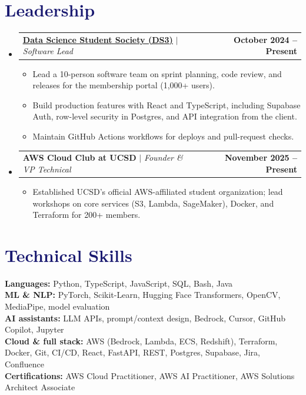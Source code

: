 \documentclass[letterpaper,11pt]{article}
\makeatletter
\newcommand{\resumeItem}[1]{
  \item\small{
    {#1 \vspace{-2pt}}
  }
}
\newcommand{\resumeProjectHeading}[2]{
    \item
    \begin{tabular*}{1.001\textwidth}{l@{\extracolsep{\fill}}r}
      \small#1 & \textbf{\small #2}\\
    \end{tabular*}\vspace{-7pt}
}
\newcommand{\resumeSubHeadingListStart}{\begin{itemize}[leftmargin=0.0in, label={}]}
\newcommand{\resumeSubHeadingListEnd}{\end{itemize}}
\newcommand{\resumeItemListStart}{\begin{itemize}}
\newcommand{\resumeItemListEnd}{\end{itemize}\vspace{-5pt}}
\newcommand\accentColor{MidnightBlue}
\makeatother
\begin{document}
\section{\textcolor{\accentColor}{Leadership}}
\vspace{-7pt}
\resumeSubHeadingListStart
\resumeProjectHeading{\textbf{\href{https://www.ds3atucsd.com/}{\underline{Data Science Student Society (DS3)}}} $|$ \emph{Software Lead}}{October 2024 -- Present}
\resumeItemListStart
\resumeItem{Lead a 10-person software team on sprint planning, code review, and releases for the membership portal (1,000+ users).}
\resumeItem{Build production features with React and TypeScript, including Supabase Auth, row-level security in Postgres, and API integration from the client.}
\resumeItem{Maintain GitHub Actions workflows for deploys and pull-request checks.}
\resumeItemListEnd
\vspace{-15pt}
\resumeProjectHeading{\textbf{AWS Cloud Club at UCSD} $|$ \emph{Founder \& VP Technical}}{November 2025 -- Present}
\resumeItemListStart
\resumeItem{Established UCSD's official AWS-affiliated student organization; lead workshops on core services (S3, Lambda, SageMaker), Docker, and Terraform for 200+ members.}
\resumeItemListEnd
\resumeSubHeadingListEnd
\vspace{-15pt}

\section{\textcolor{\accentColor}{Technical Skills}}
\begin{itemize}[leftmargin=0.15in, label={}]
  \small{\item{
        \textbf{Languages: }{Python, TypeScript, JavaScript, SQL, Bash, Java} \\
        \textbf{ML \& NLP: }{PyTorch, Scikit-Learn, Hugging Face Transformers, OpenCV, MediaPipe, model evaluation} \\
        \textbf{AI assistants: }{LLM APIs, prompt/context design, Bedrock, Cursor, GitHub Copilot, Jupyter} \\
        \textbf{Cloud \& full stack: }{AWS (Bedrock, Lambda, ECS, Redshift), Terraform, Docker, Git, CI/CD, React, FastAPI, REST, Postgres, Supabase, Jira, Confluence} \\
        \textbf{Certifications: }{AWS Cloud Practitioner, AWS AI Practitioner, AWS Solutions Architect Associate}
        }}
\end{itemize}
\vspace{-10pt}
\end{document}

